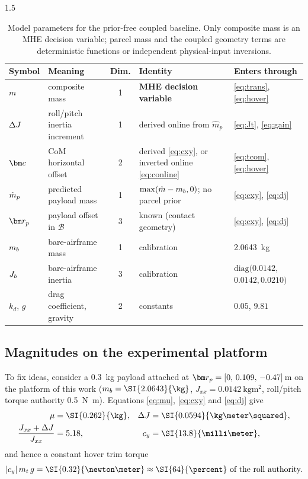 \begin{spacing}{1.5}
\begin{table}[t]
\caption{Model parameters for the prior-free coupled baseline. Only
composite mass is an MHE decision variable; parcel mass and the coupled
geometry terms are deterministic functions or independent physical-input
inversions.}
\label{tab:params}
\centering
\footnotesize
\begin{tabular}{@{}l p{} c p{} p{}@{}}
\toprule
Symbol & Meaning & Dim. & Identity & Enters through \\
\midrule
$m$ & composite mass & 1 & \textbf{MHE decision variable} & \eqref{eq:trans}, \eqref{eq:hover} \\
$\Delta J$ & roll/pitch inertia increment & 1 & derived online from $\hat m_p$ & \eqref{eq:Jt}, \eqref{eq:gain} \\
$\cvec$ & CoM horizontal offset & 2 & derived \eqref{eq:cxy}, or inverted online \eqref{eq:conline} & \eqref{eq:tcom}, \eqref{eq:hover} \\
\midrule
$\hat{m}_p$ & predicted payload mass & 1 & $\max(\hat m-m_b,0)$; no parcel prior & \eqref{eq:cxy}, \eqref{eq:dj} \\
$\rp$ & payload offset in $\mathcal{B}$ & 3 & known (contact geometry) & \eqref{eq:cxy}, \eqref{eq:dj} \\
\midrule
$m_b$ & bare-airframe mass & 1 & calibration & \SI{2.0643}{\kg} \\
$J_b$ & bare-airframe inertia & 3 & calibration & $\mathrm{diag}(0.0142,$ $0.0142, 0.0210)$ \\
$k_d$, $g$ & drag coefficient, gravity & 2 & constants & $0.05$, $9.81$ \\
\bottomrule
\end{tabular}
\end{table}

\subsection{Magnitudes on the experimental platform}\label{sec:model:magnitudes}

To fix ideas, consider a \SI{0.3}{\kg} payload attached at
$\rp = [0,\, 0.109,\, -0.47]\,$\si{\meter} on the platform of this work
($\mb = \SI{2.0643}{\kg}$, $J_{xx} = \SI{0.0142}{\kg\meter\squared}$,
roll/pitch torque authority \SI{0.5}{\newton\meter}). Equations
\eqref{eq:mu}, \eqref{eq:cxy} and \eqref{eq:dj} give
\begin{align}
\mu &= \SI{0.262}{\kg}, &
\dJ &= \SI{0.0594}{\kg\meter\squared}, \nonumber \\
\frac{J_{xx} + \dJ}{J_{xx}} &= 5.18, &
c_y &= \SI{13.8}{\milli\meter},
\label{eq:numbers}
\end{align}
and hence a constant hover trim torque
\begin{equation}
|c_y|\, \mt\, g = \SI{0.32}{\newton\meter} \approx \SI{64}{\percent}\ \text{of the roll authority.}
\label{eq:trimtorque}
\end{equation}


\end{spacing}
